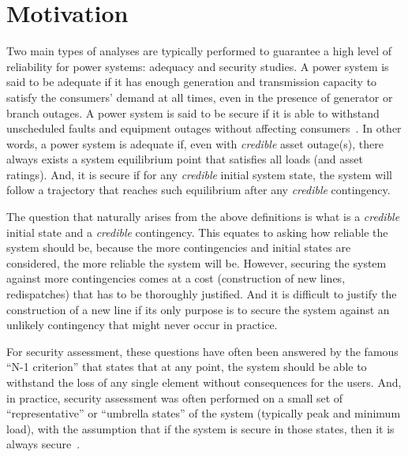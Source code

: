 \section{Motivation}

Two main types of analyses are typically performed to guarantee a high level of reliability for power systems: adequacy and security studies. A power system is said to be adequate if it has enough generation and transmission capacity to satisfy the consumers' demand at all times, even in the presence of generator or branch outages. A power system is said to be secure if it is able to withstand unscheduled faults and equipment outages without affecting consumers~\cite{AdequancySecurityDefinition}. In other words, a power system is adequate if, even with \emph{credible} asset outage(s), there always exists a system equilibrium point that satisfies all loads (and asset ratings). And, it is secure if for any \emph{credible} initial system state, the system will follow a trajectory that reaches such equilibrium after any \emph{credible} contingency.

The question that naturally arises from the above definitions is what is a \emph{credible} initial state and a \emph{credible} contingency. This equates to asking how reliable the system should be, because the more contingencies and initial states are considered, the more reliable the system will be. However, securing the system against more contingencies comes at a cost (construction of new lines, redispatches) that has to be thoroughly justified. And it is difficult to justify the construction of a new line if its only purpose is to secure the system against an unlikely contingency that might never occur in practice.

For security assessment, these questions have often been answered by the famous ``N-1 criterion'' that states that at any point, the system should be able to withstand the loss of any single element without consequences for the users. And, in practice, security assessment was often performed on a small set of ``representative'' or ``umbrella states'' of the system (typically peak and minimum load), with the assumption that if the system is secure in those states, then it is always secure~\cite{CIGREreviewOfTools}.


